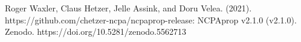 \documentclass[10pt]{article}
\begin{document}
\vspace*{\fill}

\noindent\makebox[\linewidth]{\rule{\linewidth}{0.4pt}}

\noindent Roger Waxler, Claus Hetzer, Jelle Assink, and Doru Velea. (2021). https://github.com/chetzer-ncpa/ncpaprop-release: NCPAprop v2.1.0 (v2.1.0). Zenodo. https://doi.org/10.5281/zenodo.5562713

\clearpage


\vspace*{20pt}

%
\clearpage
\tableofcontents
\clearpage


\clearpage

\clearpage

\clearpage

\clearpage

\clearpage
%

\clearpage
%
%

\clearpage
%
%

\clearpage


\end{document}

